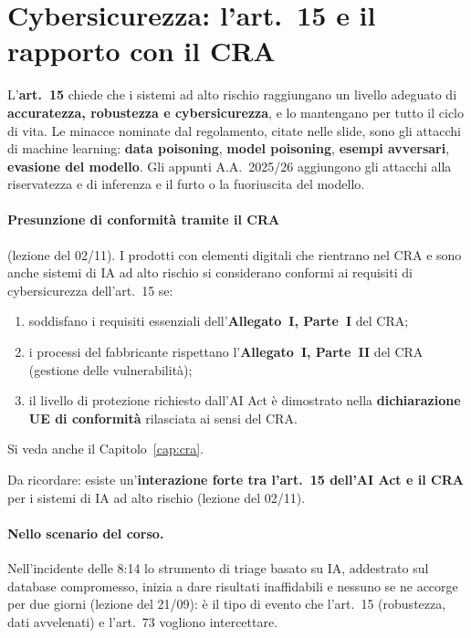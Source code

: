 \section{Cybersicurezza: l'art.~15 e il rapporto con il CRA}
\label{sec:aiact-art15}

L'\textbf{art.~15} chiede che i sistemi ad alto rischio raggiungano un livello adeguato di
\textbf{accuratezza, robustezza e cybersicurezza}, e lo mantengano per tutto il ciclo di vita. Le
minacce nominate dal regolamento, citate nelle slide, sono gli attacchi di machine learning:
\textbf{data poisoning}, \textbf{model poisoning}, \textbf{esempi avversari}, \textbf{evasione del
modello}. Gli appunti A.A.~2025/26 aggiungono gli attacchi alla riservatezza e di inferenza e il furto
o la fuoriuscita del modello.

\paragraph{Presunzione di conformità tramite il CRA} (lezione del 02/11). I prodotti con elementi digitali
che rientrano nel CRA e sono anche sistemi di IA ad alto rischio si considerano conformi ai requisiti di
cybersicurezza dell'art.~15 se:
\begin{enumerate}
  \item soddisfano i requisiti essenziali dell'\textbf{Allegato~I, Parte~I} del CRA;
  \item i processi del fabbricante rispettano l'\textbf{Allegato~I, Parte~II} del CRA (gestione delle
    vulnerabilità);
  \item il livello di protezione richiesto dall'AI Act è dimostrato nella \textbf{dichiarazione UE di
    conformità} rilasciata ai sensi del CRA.
\end{enumerate}
Si veda anche il Capitolo~\ref{cap:cra}.

\begin{esame}
Da ricordare: esiste un'\textbf{interazione forte tra l'art.~15 dell'AI Act e il CRA} per i sistemi di IA
ad alto rischio (lezione del 02/11).
\end{esame}

\paragraph{Nello scenario del corso.} Nell'incidente delle 8:14 lo strumento di triage basato su IA,
addestrato sul database compromesso, inizia a dare risultati inaffidabili e nessuno se ne accorge per due
giorni (lezione del 21/09): è il tipo di evento che l'art.~15 (robustezza, dati avvelenati) e l'art.~73
vogliono intercettare.

